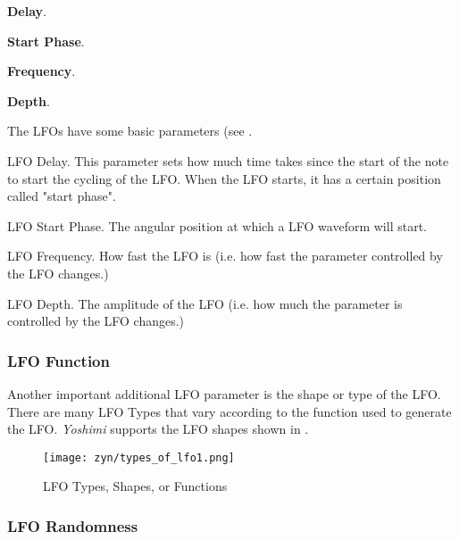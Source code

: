    \begin{enumber}
      \item \textbf{Delay}.
      \item \textbf{Start Phase}.
      \item \textbf{Frequency}.
      \item \textbf{Depth}.
   \end{enumber}

   The LFOs have some basic parameters (see
   .

   \setcounter{ItemCounter}{0}      %

   LFO Delay.
   This parameter sets how much time takes since the start of the note to
   start the cycling of the LFO.
   When the LFO starts, it has a certain position called "start phase".

   LFO Start Phase.
   The angular position at which a LFO waveform will start.

   LFO Frequency.
   How fast the LFO is (i.e. how fast the parameter controlled by
   the LFO changes.)

   LFO Depth.
   The amplitude of the LFO (i.e. how much the parameter is controlled by
   the LFO changes.)

\subsubsection{LFO Function}
\label{subsubsec:lfo_function}

   Another important additional LFO parameter is the shape or type of the
   LFO. There are many LFO Types that vary according to the function used to
   generate the LFO. \textsl{Yoshimi} supports the LFO shapes shown in
   .

\begin{figure}[H]
   \centering
   \texttt{[image: zyn/types\_of\_lfo1.png]}
   \caption[LFO Functions]{LFO Types, Shapes, or Functions}
   \label{fig:types_of_lfo}
\end{figure}

\subsubsection{LFO Randomness}
\label{subsubsec:lfo_randomness}

